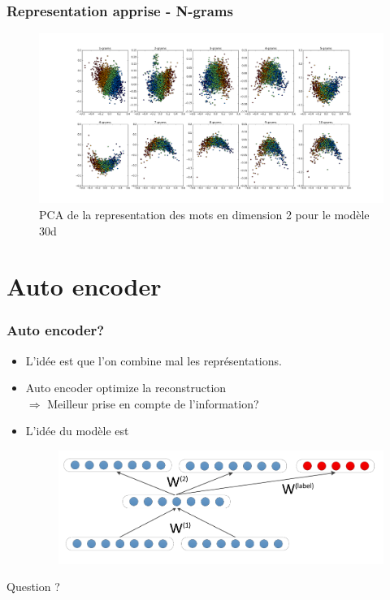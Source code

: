 \documentclass{beamer}
\begin{document}
\begin{frame}
\frametitle{Representation apprise - N-grams}
\begin{figure}[htp]
\centering
\includegraphics[scale=0.2]{fig/n_gram.png}
\caption[caption]{PCA de la representation des mots en dimension 2 pour le modèle 30d}
\end{figure}

\end{frame}


\section{Auto encoder}
\begin{frame}
\frametitle{Auto encoder?}
\begin{itemize}
\item L'idée est que l'on combine mal les représentations.
\item Auto encoder optimize la reconstruction\\
$\Rightarrow$ Meilleur prise en compte de l'information?
\item L'idée du modèle est
\begin{figure}[htp]
\centering
\includegraphics[scale=0.2]{fig/model_RAE.png}
\label{}
\end{figure}
\end{itemize}
\end{frame}



\begin{frame}
\Huge{\centerline{Question ?}}
\end{frame}

\end{document}
